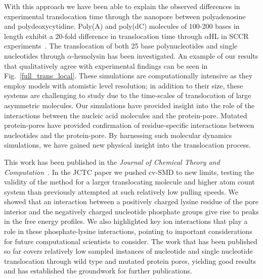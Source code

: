 \documentclass[a4paper,10pt]{article}
\newcommand{\ahl}{$\alpha$HL }
\begin{document}
With this approach we have been able to explain the observed differences in experimental translocation time through the nanopore between polyadenosine and polydeoxycytidine. Poly(A) and poly(dC) molecules of 100-200 bases in length exhibit a 20-fold difference in translocation time through \ahl in SCCR experiments~\cite{akeson}. The translocation of both 25 base polynucleotides and single nucleotides through $\alpha$-hemolysin has been investigated. An example of our results that qualitatively agree with experimental findings can be seen in Fig.~\ref{full_trans_local}. These simulations are computationally intensive as they employ models with atomistic level resolution; in addition to their size, these systems are challenging to study due to the time-scales of translocation of large asymmetric molecules. Our simulations have provided insight into the role of the interactions between the nucleic acid molecules and the protein-pore. Mutated protein-pores have provided confirmation of residue-specific interactions between nucleotides and the protein-pore. By harnessing such molecular dynamics simulations, we have gained new physical insight into the translocation process.

This work has been published in the {\em Journal of Chemical Theory and Computation}~\cite{jctc_cover}.  In the JCTC paper we pushed cv-SMD to new limits, testing the validity of the method for a larger translocating molecule and higher atom count system than previously attempted at such relatively low pulling speeds. We showed that an interaction between a positively charged lysine residue of the pore interior and the negatively charged nucleotide phosphate groups give rise to peaks in the free energy profiles. We also highlighted key ion interactions that play a role in these phosphate-lysine interactions, pointing to important considerations for future computational scientists to consider. The work that has been published so far covers relatively low sampled instances of nucleotide and single nucleotide translocation through wild type and mutated protein pores, yielding good results and has established the groundwork for further publications. 
\end{document}
